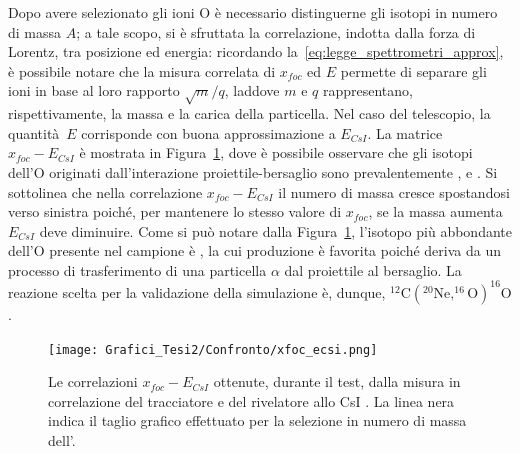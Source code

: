 Dopo avere selezionato gli ioni O è necessario distinguerne gli isotopi in numero di massa $A$; a tale scopo, si è sfruttata la correlazione, indotta dalla forza di Lorentz, tra posizione ed energia: ricordando la~\ref{eq:legge_spettrometri_approx}, è possibile notare che la misura correlata di $x_{foc}$ ed $E$ permette di separare gli ioni in base al loro rapporto $\sqrt{m}/q$, laddove $m$ e $q$ rappresentano, rispettivamente, la massa e la carica della particella.
Nel caso del telescopio, la quantità~$E$ corrisponde con buona approssimazione a $E_{CsI}$.
La matrice $x_{foc} - E_{CsI}$ è mostrata in Figura~\ref{fig:xfoc2_csi_standard}, dove è possibile osservare che gli isotopi dell'O originati dall'interazione proiettile-bersaglio sono prevalentemente ,  e .
Si sottolinea che nella correlazione $x_{foc} - E_{CsI}$ il numero di massa cresce spostandosi verso sinistra poiché, per mantenere lo stesso valore di $x_{foc}$, se la massa aumenta $E_{CsI}$ deve diminuire.
Come si può notare dalla Figura~\ref{fig:xfoc2_csi_standard}, l'isotopo più abbondante dell'O presente nel campione è , la cui produzione è favorita poiché deriva da un processo di trasferimento di una particella $\alpha$ dal proiettile al bersaglio. 
La reazione scelta per la validazione della simulazione è, dunque, $^{12}\mbox{C}  ( ^{20}\mbox{Ne}, ^{16}\mbox{O} )  ^{16}\mbox{O} $.

\begin{figure} [!p]
	\centering
	\texttt{[image: Grafici\_Tesi2/Confronto/xfoc\_ecsi.png]}
	\caption{Le correlazioni $x_{foc} - E_{CsI}$ ottenute, durante il test, dalla misura in correlazione del tracciatore e del rivelatore allo CsI . La linea nera indica il taglio grafico effettuato per la selezione in numero di massa dell'.} \label{fig:xfoc2_csi_standard}
\end{figure}



\subsection{}



